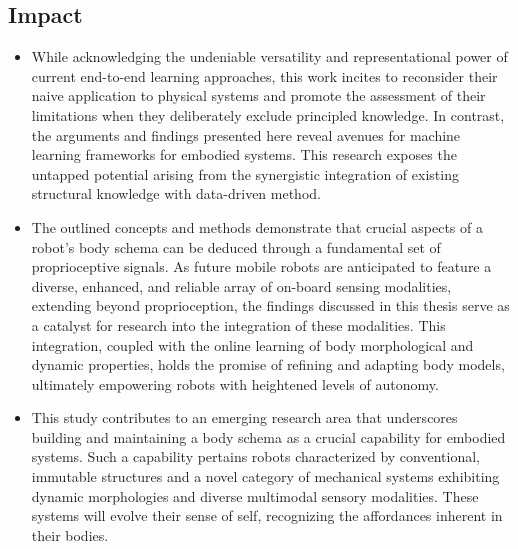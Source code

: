 \documentclass[12pt, a4paper]{article}
\newcommand{\redtext}[1]{\textcolor{red}{#1}}
\begin{document}
\subsection*{Impact}

\begin{itemize}
	
	\item While acknowledging the undeniable versatility and representational power of current end-to-end learning approaches, this work incites to reconsider their naive application to physical systems and promote the assessment of their limitations when they deliberately exclude principled knowledge. In contrast, the arguments and findings presented here reveal avenues for machine learning frameworks for embodied systems. This research exposes the untapped potential arising from the synergistic integration of existing structural knowledge with data-driven method.
	
	\item The outlined concepts and methods demonstrate that crucial aspects of a robot's body schema can be deduced through a fundamental set of proprioceptive signals. As future mobile robots are anticipated to feature a diverse, enhanced, and reliable array of on-board sensing modalities, extending beyond proprioception, the findings discussed in this thesis serve as a catalyst for research into the integration of these modalities. This integration, coupled with the online learning of body morphological and dynamic properties, holds the promise of refining and adapting body models, ultimately empowering robots with heightened levels of autonomy.
	
	\item This study contributes to an emerging research area that underscores building and maintaining a body schema as a crucial capability for embodied systems. Such a capability pertains robots characterized by conventional, immutable structures and a novel category of mechanical systems exhibiting dynamic morphologies and diverse multimodal sensory modalities. These systems will evolve their sense of self, recognizing the affordances inherent in their bodies.
	

\end{itemize}
\end{document}
